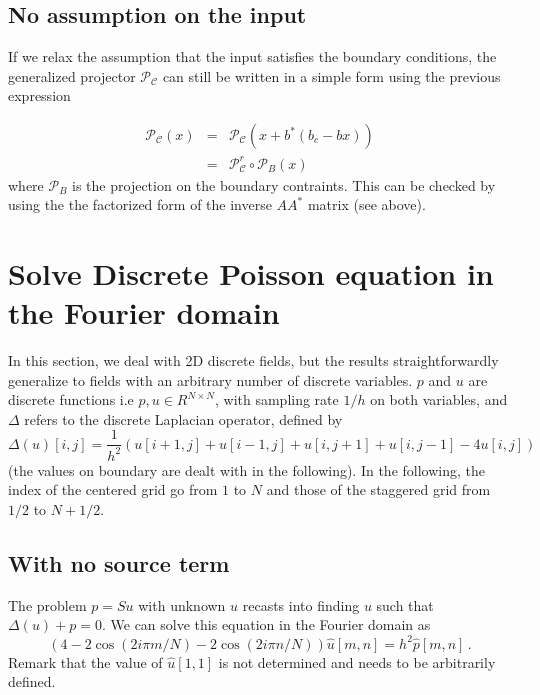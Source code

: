 \documentclass[13pt,aps,prb,preprint]{article}
\begin{document}

\subsection{No assumption on the input}
If we relax the assumption that the input satisfies the boundary conditions, the generalized projector $\mathcal{P}_\mathcal{C}$ can still be written in a simple form using the previous expression

\begin{eqnarray}
 \mathcal{P}_{\mathcal{C}}(x) & = & \mathcal{P}_{\mathcal{C}} (x + b^*(b_c -bx))\\
 & = &\mathcal{P}^r_{\mathcal{C}} \circ \mathcal{P}_B (x)
\end{eqnarray}
where $\mathcal{P}_B$ is the projection on the boundary contraints. This can be checked by using the the factorized form of the inverse $AA^*$ matrix (see above).



\section{Solve Discrete Poisson equation in the Fourier domain}
In this section, we deal with 2D discrete fields, but the results straightforwardly generalize to fields with an arbitrary number of discrete variables. $p$ and $u$ are discrete functions i.e $p,u \in R^{N\times N}$, with sampling rate $1/h$ on both variables, and $\Delta$ refers to the discrete Laplacian operator, defined by
$$\Delta(u)[i,j]=\frac{1}{h^2} \left(u[i+1,j]+u[i-1,j]+u[i,j+1]+u[i,j-1]-4u[i,j] \right)$$
(the values on boundary are dealt with in the following). In the following, the index of the centered grid go from $1$ to $N$ and those of the staggered grid from $1/2$ to $N+1/2$.

\subsection{With no source term}
The problem $p=Su$ with unknown $u$ recasts into finding $u$ such that $\Delta (u) + p =0$. We can solve this equation in the Fourier domain as
\begin{equation}
	\left( 4 -2 \cos (2i\pi m/N) -2 \cos (2i\pi n/N) \right) \hat{u}[m,n] = h^2 \hat{p}[m,n] \, .
\end{equation}
Remark that the value of $\hat{u}[1,1]$ is not determined and needs to be arbitrarily defined.
\end{document}
